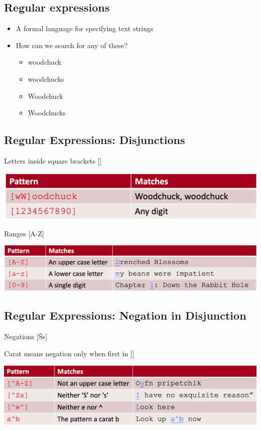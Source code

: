 \documentclass[11pt]{article}
\theoremstyle{definition}
\begin{document}
\subsection{Regular expressions}
\begin{itemize}
  \item A formal language for specifying text strings
  \item How can we search for any of these?
  \begin{itemize}
    \item woodchuck
    \item woodchucks
    \item Woodchuck
    \item Woodchucks
  \end{itemize}
\end{itemize}

\subsection{Regular Expressions: Disjunctions}
Letters inside square brackets []

\includegraphics[width=\textwidth]{7.png}

Ranges [A-Z]

\includegraphics[width=\textwidth]{8.png}

\subsection{Regular Expressions: Negation in Disjunction}
Negations [\^Ss]

Carat means negation only when first in []

\includegraphics[width=\textwidth]{9.png}
\end{document}
